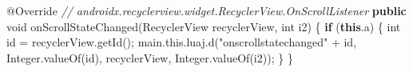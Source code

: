 \documentclass[
]{article}
\newenvironment{Shaded}{}{}
\newcommand{\AttributeTok}[1]{\textcolor[rgb]{0.49,0.56,0.16}{#1}}
\newcommand{\BuiltInTok}[1]{\textcolor[rgb]{0.00,0.50,0.00}{#1}}
\newcommand{\CommentTok}[1]{\textcolor[rgb]{0.38,0.63,0.69}{\textit{#1}}}
\newcommand{\ControlFlowTok}[1]{\textcolor[rgb]{0.00,0.44,0.13}{\textbf{#1}}}
\newcommand{\DataTypeTok}[1]{\textcolor[rgb]{0.56,0.13,0.00}{#1}}
\newcommand{\FunctionTok}[1]{\textcolor[rgb]{0.02,0.16,0.49}{#1}}
\newcommand{\KeywordTok}[1]{\textcolor[rgb]{0.00,0.44,0.13}{\textbf{#1}}}
\newcommand{\NormalTok}[1]{#1}
\newcommand{\OperatorTok}[1]{\textcolor[rgb]{0.40,0.40,0.40}{#1}}
\newcommand{\StringTok}[1]{\textcolor[rgb]{0.25,0.44,0.63}{#1}}
\begin{document}
\begin{Shaded}
\begin{Highlighting}[]
        \AttributeTok{@Override} \CommentTok{// androidx.recyclerview.widget.RecyclerView.OnScrollListener}
        \KeywordTok{public} \DataTypeTok{void} \FunctionTok{onScrollStateChanged}\OperatorTok{(}\NormalTok{RecyclerView recyclerView}\OperatorTok{,} \DataTypeTok{int}\NormalTok{ i2}\OperatorTok{)} \OperatorTok{\{}
            \ControlFlowTok{if} \OperatorTok{(}\KeywordTok{this}\OperatorTok{.}\FunctionTok{a}\OperatorTok{)} \OperatorTok{\{}
                \DataTypeTok{int}\NormalTok{ id }\OperatorTok{=}\NormalTok{ recyclerView}\OperatorTok{.}\FunctionTok{getId}\OperatorTok{();}
\NormalTok{                main}\OperatorTok{.}\FunctionTok{this}\OperatorTok{.}\FunctionTok{luaj}\OperatorTok{.}\FunctionTok{d}\OperatorTok{(}\StringTok{"onscrollstatechanged"} \OperatorTok{+}\NormalTok{ id}\OperatorTok{,} \BuiltInTok{Integer}\OperatorTok{.}\FunctionTok{valueOf}\OperatorTok{(}\NormalTok{id}\OperatorTok{),}\NormalTok{ recyclerView}\OperatorTok{,} \BuiltInTok{Integer}\OperatorTok{.}\FunctionTok{valueOf}\OperatorTok{(}\NormalTok{i2}\OperatorTok{));}
            \OperatorTok{\}}
        \OperatorTok{\}}


\end{Highlighting}
\end{Shaded}
\end{document}
